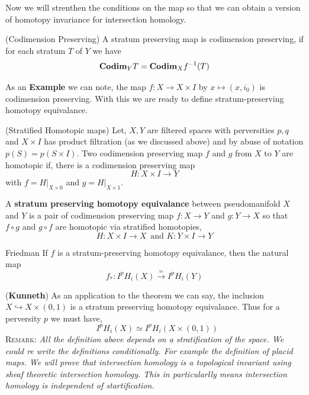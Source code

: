 \documentclass[11pt]{article}
\begin{document}
    \noindent Now we will strenthen the conditions on the map so that we can obtain a version of homotopy invariance for intersection homology.

    \begin{Def}{(Codimension Preserving)}{}
        A stratum preserving map is codimension preserving, if for each stratum $T$ of $Y$ we have $$\mathbf{Codim}_YT =\mathbf{Codim}_Xf^{-1}(T)$$
    \end{Def}

  \noindent As an \textbf{Example} we can note, the map $f : X \to X \times I$ by $x \mapsto (x,i_0)$ is codimension preserving. With this we are ready to define stratum-preserving homotopy equivalance.

  \begin{Def}{(Stratified Homotopic maps)}{}
     Let, $X,Y$ are filtered spaces with perversities $p,q$ and $X\times I$ has product filtration (as we discussed above) and by abuse of notation $p(S)=p(S \times I)$. Two codimension preserving map $f$ and $g$ from $X$ to $Y$ are homotopic if, there is a codimension preserving map $$H : X \times I \to Y$$ with $f = H|_{X\times \qty{0}}$ and $g= H|_{X \times \qty{1}}$.

     \vspace*{0.2cm}

     \noindent A \textbf{stratum preserving homotopy equivalance} between pseudomanifold $X$ and $Y$ is a pair of codimension preserving map $f: X \to Y$ and $g:Y \to X$  so that $f \circ g $ and $g \circ f$ are homotopic via stratified homotopies, $$H : X \times I \to X \, \text{ and } K: Y \times I \to Y$$
  \end{Def}

  \begin{Thm}{Friedman \cite{Friedman_2003}}{}
          If $f$ is a stratum-preserving homotopy equivalance, then the natural map $$f_{\ast}:I^pH_i(X) \xrightarrow{\simeq} I^pH_i(Y)$$
  \end{Thm}

  \noindent (\textbf{Kunneth}) As an application to the theorem we can say, the inclusion $X \hookrightarrow X \times (0,1)$ is a stratum preserving homotopy equivalance. Thus for a perversity $p$ we must have, \[\text{  }  I^pH_i(X) \simeq I^pH_i(X\times (0,1))\] \textsc{Remark:} \textit{All the definition above depends on a stratification of the space. We could re write the definitions conditionally. For example the definition of placid maps. We will prove that intersection homology is a topological invariant using sheaf theoretic intersection homology. This in particularlly means intersection homology is independent of startification.}
\end{document}
